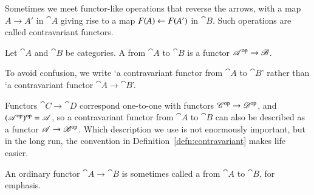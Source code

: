 Sometimes we meet functor-like operations that reverse the arrows, with a
map $A \to A'$ in $\cat{A}$ giving rise to a map $F(A) \leftarrow F(A')$ in
$\cat{B}$.  Such operations are called contravariant functors.

\begin{defn}
\label{defn:contravariant}
Let $\cat{A}$ and $\cat{B}$ be categories.  A  from $\cat{A}$ to $\cat{B}$ is a functor $\mathscr{A}^{\mathrm{op}} \to
\mathscr{B}$.
\end{defn}

To avoid confusion, we write `a contravariant functor from $\cat{A}$ to
$\cat{B}$' rather than `a contravariant functor $\cat{A} \to \cat{B}$'.

Functors $\cat{C} \to \cat{D}$ correspond one-to-one with functors
$\mathscr{C}^{\mathrm{op}} \to \mathscr{D}^{\mathrm{op}}$, and $(\mathscr{A}^{\mathrm{op}})^{\mathrm{op}} = \mathscr{A}$, so a
contravariant functor from $\cat{A}$ to $\cat{B}$ can also be described as
a functor $\mathscr{A} \to \mathscr{B}^{\mathrm{op}}$.  Which description we use is not
enormously important, but in the long run, the convention in
Definition~\ref{defn:contravariant} makes life easier.

An ordinary functor $\cat{A} \to \cat{B}$ is sometimes called a
 from $\cat{A}$ to $\cat{B}$, for emphasis.


